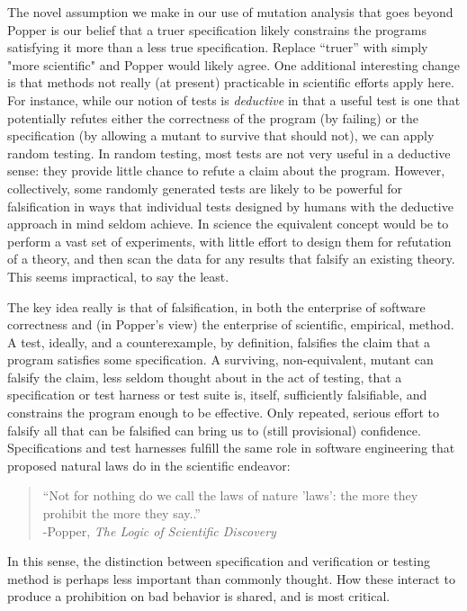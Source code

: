 \documentclass{svjour3}
\begin{document}
The novel assumption we make in our use of mutation analysis that goes
beyond Popper is our belief that a truer specification likely constrains
the programs satisfying it more than a less true specification.  Replace ``truer'' with
simply "more scientific" and Popper would likely agree.
One additional interesting change is that methods not really (at
present) practicable in scientific efforts apply here.  For instance,
while our notion of tests is \emph{deductive} in that a useful test is
one that potentially refutes either the correctness of the program (by
failing) or the specification (by allowing a mutant to survive that
should not), we can apply random testing.  In random testing, most
tests are not very useful in a deductive sense: they provide little
chance to refute a claim about the program.  However, collectively,
some randomly generated tests are likely to be powerful for
falsification in ways that individual tests designed by humans with
the deductive approach in mind seldom achieve.  In science the
equivalent concept would be to perform a vast set of experiments, with
little effort to design them for refutation of a theory, and then scan
the data for any results that falsify an existing theory.  This seems
impractical, to say the least.

The key idea really is that of falsification, in both the enterprise
of software correctness and (in Popper's view) the enterprise of
scientific, empirical, method.  A test, ideally, and a counterexample,
by definition, falsifies the claim that a program satisfies some
specification.  A surviving, non-equivalent, mutant can falsify the
claim, less seldom thought about in the act of testing, that a
specification or test harness or test suite is, itself, sufficiently
falsifiable, and constrains the program enough to be effective.  Only
repeated, serious effort to falsify all that can be falsified can
bring us to (still provisional) confidence.  Specifications and test
harnesses fulfill the same role in software engineering that proposed
natural laws do in the scientific endeavor:


\begin{quote}
``Not for nothing do we call the laws of nature 'laws': the more they
prohibit the more they say..''\\
-Popper, \emph{The Logic of Scientific Discovery} \cite{Popper}
\end{quote}

\noindent In this sense, the distinction between specification and
verification or testing method is perhaps less important than commonly
thought.  How these interact to produce a prohibition on bad behavior
is shared, and is most critical.
\end{document}
